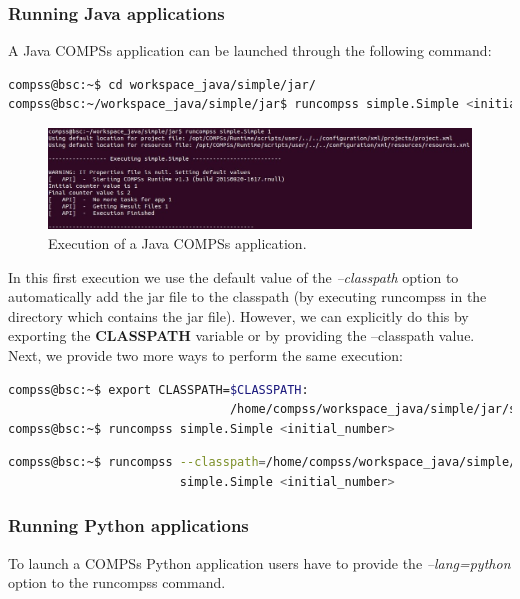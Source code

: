 \subsubsection{Running Java applications}
A Java COMPSs application can be launched through the following command:
\begin{lstlisting}[language=bash]
compss@bsc:~$ cd workspace_java/simple/jar/
compss@bsc:~/workspace_java/simple/jar$ runcompss simple.Simple <initial_number>
\end{lstlisting}

\begin{figure}[h!]
  \centering
    \includegraphics[width=\textwidth]{./Sections/2_Execution/Figures/java_execution.jpeg}
    \caption{Execution of a Java COMPSs application.}
    \label{fig:java_execution}
\end{figure}
\vspace{-0.4cm}

In this first execution we use the default value of the \textit{--classpath} option to automatically add the jar
file to the classpath (by executing runcompss in the directory which contains the jar file). However,
we can explicitly do this by exporting the \textbf{CLASSPATH} variable or by providing the 
--classpath value. Next, we provide two more ways to perform the same execution:

\begin{lstlisting}[language=bash]
compss@bsc:~$ export CLASSPATH=$CLASSPATH:
                               /home/compss/workspace_java/simple/jar/simple.jar
compss@bsc:~$ runcompss simple.Simple <initial_number>
\end{lstlisting}

\begin{lstlisting}[language=bash]
compss@bsc:~$ runcompss --classpath=/home/compss/workspace_java/simple/jar/simple.jar 
                        simple.Simple <initial_number>
\end{lstlisting}


\subsubsection{Running Python applications}
To launch a COMPSs Python application users have to provide the \textit{--lang=python} option to the runcompss command. 

